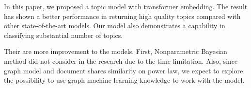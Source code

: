In this paper, we proposed a topic model with transformer embedding. The result has shown a better performance in returning high quality topics compared with other state-of-the-art models. Our model also demonstrates a capability in classifying substantial number of topics.

Their are more improvement to the models. First, Nonparametric Bayesian method did not consider in the research due to the time limitation. Also, since graph model and document shares similarity on power law, we expect to explore the possibility to use graph machine learning knowledge to work with the model.